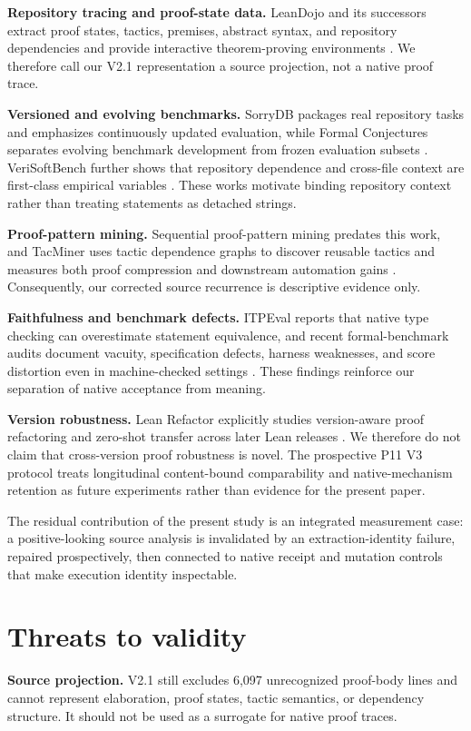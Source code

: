 \documentclass[11pt]{article}
\begin{document}
\textbf{Repository tracing and proof-state data.} LeanDojo and its successors extract proof states, tactics, premises, abstract syntax, and repository dependencies and provide interactive theorem-proving environments \cite{yang2023leandojo,leandojov2}. We therefore call our V2.1 representation a source projection, not a native proof trace.

\textbf{Versioned and evolving benchmarks.} SorryDB packages real repository tasks and emphasizes continuously updated evaluation, while Formal Conjectures separates evolving benchmark development from frozen evaluation subsets \cite{letson2026sorrydb,firsching2026formalconjectures}. VeriSoftBench further shows that repository dependence and cross-file context are first-class empirical variables \cite{xin2026verisoftbench}. These works motivate binding repository context rather than treating statements as detached strings.

\textbf{Proof-pattern mining.} Sequential proof-pattern mining predates this work, and TacMiner uses tactic dependence graphs to discover reusable tactics and measures both proof compression and downstream automation gains \cite{nawaz2019pvs,xin2025tacminer}. Consequently, our corrected source recurrence is descriptive evidence only.

\textbf{Faithfulness and benchmark defects.} ITPEval reports that native type checking can overestimate statement equivalence, and recent formal-benchmark audits document vacuity, specification defects, harness weaknesses, and score distortion even in machine-checked settings \cite{wu2026itpeval,ammanamanchi2026faults}. These findings reinforce our separation of native acceptance from meaning.

\textbf{Version robustness.} Lean Refactor explicitly studies version-aware proof refactoring and zero-shot transfer across later Lean releases \cite{lu2026leanrefactor}. We therefore do not claim that cross-version proof robustness is novel. The prospective P11 V3 protocol treats longitudinal content-bound comparability and native-mechanism retention as future experiments rather than evidence for the present paper.

The residual contribution of the present study is an integrated measurement case: a positive-looking source analysis is invalidated by an extraction-identity failure, repaired prospectively, then connected to native receipt and mutation controls that make execution identity inspectable.

\section{Threats to validity}
\textbf{Source projection.} V2.1 still excludes 6,097 unrecognized proof-body lines and cannot represent elaboration, proof states, tactic semantics, or dependency structure. It should not be used as a surrogate for native proof traces.
\end{document}

